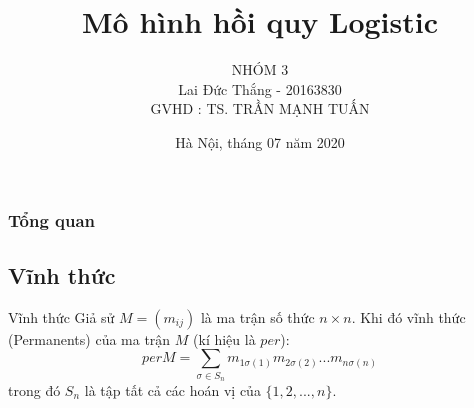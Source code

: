 \documentclass[notheorems,hyperref={bookmarks=true}]{beamer}
\title[{\makebox[.45\paperwidth]{Xemina Tin}}]{Mô hình hồi quy Logistic }
\author[NHÓM 3 ]{NHÓM 3 \\
Lai Đức Thắng - 20163830\\
GVHD : TS. TRẦN MẠNH TUẤN}
\date{Hà Nội, tháng 07 năm 2020}
\theoremstyle{plain}
\begin{document}
\begin{footnotesize}
\begin{frame}
	\frametitle{}
	\maketitle
\end{frame}



\begin{frame}
\frametitle{Tổng quan } %
\tableofcontents %
\end{frame}

\subsection{Vĩnh thức}
\begin{frame}{Vĩnh thức}
Giả sử $M= (m_{ij})$ là ma trận số thức $n \times n$. Khi đó vĩnh thức (Permanents) của ma trận $M$ (kí hiệu là $per$):
\begin{equation*}
per M = \displaystyle \sum_{\sigma \in S_{n}}m_{1\sigma(1)}m_{2\sigma(2)}...m_{n\sigma(n)}
\end{equation*}
trong đó $S_{n}$ là tập tất cả các hoán vị của $\{1,2,...,n\}$.
\end{frame}


\end{footnotesize}
\end{document}

